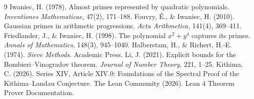 \documentclass[11pt,a4paper]{article}
\begin{document}

\begin{thebibliography}{9}
  Iwaniec, H. (1978). Almost primes represented by quadratic polynomials. \emph{Inventiones Mathematicae}, 47(2), 171–188.
  Fouvry, É., \& Iwaniec, H. (2010). Gaussian primes in arithmetic progressions. \emph{Acta Arithmetica}, 141(4), 369–411.
  Friedlander, J., \& Iwaniec, H. (1998). The polynomial \(x^{2}+y^{4}\) captures its primes. \emph{Annals of Mathematics}, 148(3), 945–1040.
  Halberstam, H., \& Richert, H.‑E. (1974). \emph{Sieve Methods}. Academic Press.
  Li, J. (2021). Explicit bounds for the Bombieri–Vinogradov theorem. \emph{Journal of Number Theory}, 221, 1–25.
  Kithima, C. (2026). Series XIV, Article XIV.0: Foundations of the Spectral Proof of the Kithima–Landau Conjecture.
  The Lean Community (2026). Lean 4 Theorem Prover Documentation.
\end{thebibliography}
\end{document}
